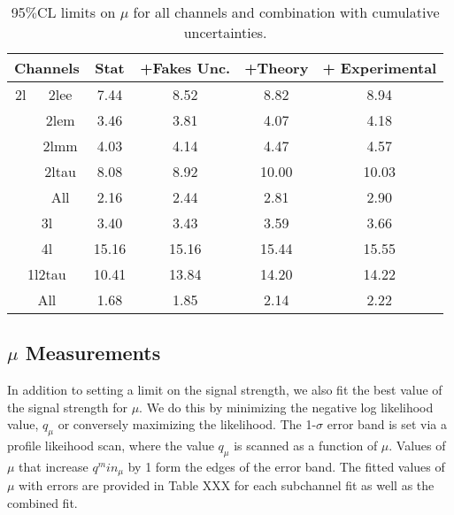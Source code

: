 \begin{table}[htbp]
\begin{center}
\begin{tabular}{|c|c|c|c|c|c|}
\hline 
\multicolumn{2}{|c|}{ Channels} &  Stat &  +Fakes Unc.  & +Theory  & + Experimental\\ 
\hline 
2l       & 2lee  & 7.44 & 8.52 & 8.82 &8.94 \\ 
         & 2lem   &3.46 & 3.81 & 4.07 &4.18 \\ 
        & 2lmm   & 4.03 & 4.14 & 4.47 &4.57 \\ 
        & 2ltau   &8.08 & 8.92 & 10.00 &10.03 \\ 
        &  All   & 2.16 & 2.44 & 2.81 &2.90 \\ 
\hline 
\multicolumn{2}{|c|}{ 3l }  &3.40 & 3.43 & 3.59 &3.66 \\ 
\hline 
\multicolumn{2}{|c|}{ 4l }  & 15.16 & 15.16 & 15.44 &15.55 \\ 
\hline 
\multicolumn{2}{|c|}{ 1l2tau }  & 10.41 & 13.84 & 14.20 &14.22 \\ 
\hline 
\multicolumn{2}{|c|}{ All } & 1.68 & 1.85 & 2.14 &2.22 \\ 
\hline 
\end{tabular} 
\caption{\label{table:results_cumulative} 95$\%$CL limits on $\mu$ for all channels and combination with cumulative uncertainties.}
\end{center} 
\end{table} 



\subsection{$\mu$ Measurements}

In addition to setting a limit on the signal strength, we also fit the best value of the signal strength for $\mu$. We do this by minimizing the negative log likelihood value, $q_{\mu}$ or conversely maximizing the likelihood. The 1-$\sigma$ error band is set via a profile likeihood scan, where the value $q_{\mu}$ is scanned as a function of $\mu$. Values of $\mu$ that increase $q^min_{\mu}$ by 1 form the edges of the error band. The fitted values of $\mu$ with errors are provided in Table XXX for each subchannel fit as well as the combined fit. 

